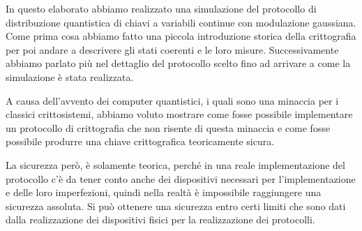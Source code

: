 In questo elaborato abbiamo realizzato una simulazione del protocollo di distribuzione quantistica di chiavi a variabili continue con modulazione gaussiana. Come prima cosa abbiamo fatto una piccola introduzione storica della crittografia per poi andare a descrivere gli stati coerenti e le loro misure. Successivamente abbiamo parlato pi\`u nel dettaglio del protocollo scelto fino ad arrivare a come la simulazione \`e stata realizzata.

A causa dell'avvento dei computer quantistici, i quali sono una minaccia per i classici crittosistemi, abbiamo voluto mostrare come fosse possibile implementare un protocollo di crittografia che non risente di questa minaccia e come fosse possibile produrre una chiave crittografica teoricamente sicura.

La sicurezza per\`o, \`e solamente teorica, perch\'e in una reale implementazione del protocollo c'\`e da tener conto anche dei dispositivi necessari per l'implementazione e delle loro imperfezioni, quindi nella realt\`a \`e impossibile raggiungere una sicurezza assoluta. Si pu\`o ottenere una sicurezza entro certi limiti che sono dati dalla realizzazione dei dispositivi fisici per la realizzazione dei protocolli.


